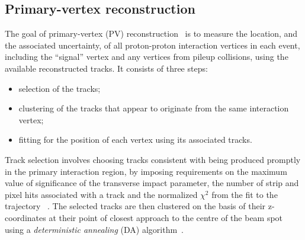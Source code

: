 \subsection*{Primary-vertex reconstruction}
The goal of primary-vertex (PV) reconstruction~\cite{Speer:927395}  is to measure the location, and the associated
uncertainty, of all proton-proton interaction vertices in each event, including the ``signal'' vertex
and any vertices from pileup collisions, using the available reconstructed tracks.  
It consists of three steps: 
\begin{itemize} 
\item  selection of the tracks;
\item clustering of the tracks that appear to originate from the same interaction vertex;
\item fitting for the position of each vertex using its associated tracks.
\end{itemize}
Track selection involves choosing tracks consistent with being produced promptly in the primary interaction region, by imposing requirements on the maximum value of significance of the transverse impact parameter,  the number of strip and pixel hits associated with a track and the normalized
$\chi^2$ from the fit to the trajectory  ~\cite{Chatrchyan:2014fea}.
The selected tracks are then clustered on the basis of their z-coordinates at their point of closest approach to the centre of the beam spot  using a
\textit{deterministic annealing} (DA) algorithm~\cite{726788}. 
